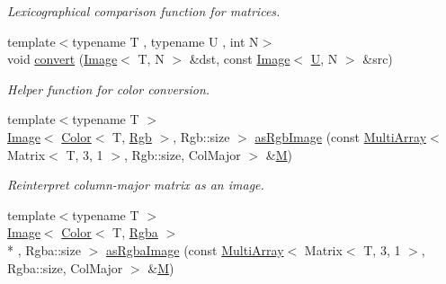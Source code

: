 \begin{DoxyCompactItemize}
\begin{DoxyCompactList}\small\item\em Lexicographical comparison function for matrices. \end{DoxyCompactList}\item 
\hypertarget{group___image_ga4e5c520a37ac3ab27aa74f10d3c47b25}{{\footnotesize template$<$typename T , typename U , int N$>$ }\\void \hyperlink{group___image_ga4e5c520a37ac3ab27aa74f10d3c47b25}{convert} (\hyperlink{class_d_o_1_1_image}{Image}$<$ T, N $>$ \&dst, const \hyperlink{class_d_o_1_1_image}{Image}$<$ \hyperlink{struct_d_o_1_1_u}{U}, N $>$ \&src)}\label{group___image_ga4e5c520a37ac3ab27aa74f10d3c47b25}

\begin{DoxyCompactList}\small\item\em Helper function for color conversion. \end{DoxyCompactList}\item 
\hypertarget{group___image_ga6ca7c2968f16fe642348e58d2d72c3d8}{{\footnotesize template$<$typename T $>$ }\\\hyperlink{class_d_o_1_1_image}{Image}$<$ \hyperlink{class_d_o_1_1_color}{Color}$<$ T, \hyperlink{group___color_space_gaad92fea51e98e11252ac86f2c8665d13}{Rgb} $>$, Rgb\-::size $>$ \hyperlink{group___image_ga6ca7c2968f16fe642348e58d2d72c3d8}{as\-Rgb\-Image} (const \hyperlink{class_d_o_1_1_multi_array}{Multi\-Array}$<$ Matrix$<$ T, 3, 1 $>$, Rgb\-::size, Col\-Major $>$ \&\hyperlink{struct_d_o_1_1_m}{M})}\label{group___image_ga6ca7c2968f16fe642348e58d2d72c3d8}

\begin{DoxyCompactList}\small\item\em Reinterpret column-\/major matrix as an image. \end{DoxyCompactList}\item 
\hypertarget{group___image_ga4392375bc20250c8f8cf6c571ab3e5c8}{{\footnotesize template$<$typename T $>$ }\\\hyperlink{class_d_o_1_1_image}{Image}$<$ \hyperlink{class_d_o_1_1_color}{Color}$<$ T, \hyperlink{group___color_space_ga52ed562e9155b12e5395633a01476810}{Rgba} $>$\\*
, Rgba\-::size $>$ \hyperlink{group___image_ga4392375bc20250c8f8cf6c571ab3e5c8}{as\-Rgba\-Image} (const \hyperlink{class_d_o_1_1_multi_array}{Multi\-Array}$<$ Matrix$<$ T, 3, 1 $>$, Rgba\-::size, Col\-Major $>$ \&\hyperlink{struct_d_o_1_1_m}{M})}\label{group___image_ga4392375bc20250c8f8cf6c571ab3e5c8}


\end{DoxyCompactItemize}
